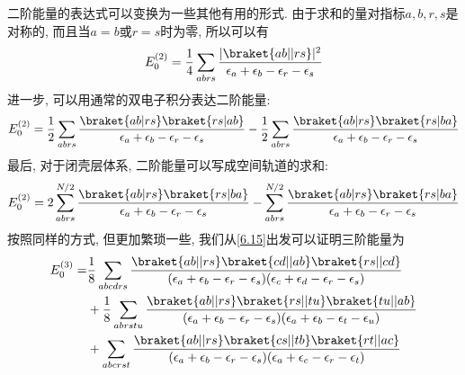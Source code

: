 二阶能量的表达式可以变换为一些其他有用的形式. 
由于求和的量对指标$a,b, r,s$是对称的, 
而且当$a=b$或$r=s$时为零, 
所以可以有
\begin{align}
E_0^{(2)} = \frac{1}{4} \sum_{abrs}\frac{|\braket{ab||rs}|^2}{\epsilon_a + \epsilon_b -\epsilon_r-\epsilon_s}
\label{6.72}
\end{align}
进一步, 
可以用通常的双电子积分表达二阶能量:
\begin{align}
E_0^{(2)} = \frac{1}{2}\sum_{abrs}\frac{\braket{ab|rs}\braket{rs|ab}}{\epsilon_a + \epsilon_b -\epsilon_r-\epsilon_s}-\frac{1}{2}\sum_{abrs}\frac{\braket{ab|rs}\braket{rs|ba}}{\epsilon_a + \epsilon_b -\epsilon_r-\epsilon_s}
\label{6.73}
\end{align}
最后, 
对于闭壳层体系, 
二阶能量可以写成空间轨道的求和:
\begin{align}
E_0^{(2)} = 2\sum_{abrs}^{N/2}\frac{\braket{ab|rs}\braket{rs|ba}}{\epsilon_a + \epsilon_b -\epsilon_r-\epsilon_s}
    -\sum_{abrs}^{N/2}\frac{\braket{ab|rs}\braket{rs|ba}}{\epsilon_a + \epsilon_b -\epsilon_r-\epsilon_s}
\label{6.74}
\end{align}
按照同样的方式, 
但更加繁琐一些, 
我们从\autoref{6.15}出发可以证明三阶能量为
\begin{align}
E_0^{(3)} = & \frac{1}{8} \sum_{abcdrs} \frac{\braket{ab||rs}\braket{cd||ab}\braket{rs||cd}}{(\epsilon_a + \epsilon_b -\epsilon_r-\epsilon_s)(\epsilon_c + \epsilon_d -\epsilon_r-\epsilon_s)} \notag\\
          & + \frac{1}{8} \sum_{abrstu} \frac{\braket{ab||rs}\braket{rs||tu}\braket{tu||ab}}{(\epsilon_a + \epsilon_b -\epsilon_r-\epsilon_s)(\epsilon_a + \epsilon_b -\epsilon_t-\epsilon_u)} \notag\\
          & + \sum_{abcrst}\frac{\braket{ab||rs}\braket{cs||tb}\braket{rt||ac}}{(\epsilon_a + \epsilon_b -\epsilon_r-\epsilon_s)(\epsilon_a + \epsilon_c -\epsilon_r-\epsilon_t)}
          \label{6.75}
\end{align}

